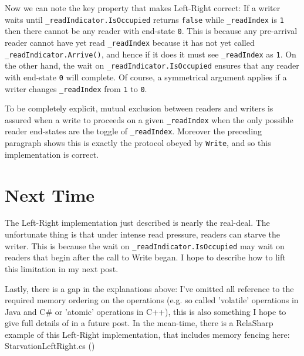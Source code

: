 \documentclass[11pt]{article}
\begin{document}
Now we can note the key property that makes Left-Right correct: If a writer waits until \texttt{\_readIndicator.IsOccupied} returns \texttt{false} while \texttt{\_readIndex} is \texttt{1} then there cannot be any reader with end-state \texttt{0}. This is because any pre-arrival reader cannot have yet read \texttt{\_readIndex} because it has not yet called \texttt{\_readIndicator.Arrive()}, and hence if it does it must see \texttt{\_readIndex} as \texttt{1}. On the other hand, the wait on \texttt{\_readIndicator.IsOccupied} ensures that any reader with end-state \texttt{0} will complete. Of course, a symmetrical argument applies if a writer changes \texttt{\_readIndex} from \texttt{1} to \texttt{0}.

To be completely explicit, mutual exclusion between readers and writers is assured when a write to proceeds on a given \texttt{\_readIndex} when the only possible reader end-states are the toggle of \texttt{\_readIndex}. Moreover the preceding paragraph shows this is exactly the protocol obeyed by \texttt{Write}, and so this implementation is correct.

\section{Next Time}

The Left-Right implementation just described is nearly the real-deal. The unfortunate thing is that under intense read pressure, readers can starve the writer. This is because the wait on \texttt{\_readIndicator.IsOccupied} may wait on readers that begin after the call to Write began. I hope to describe how to lift this limitation in my next post.

Lastly, there is a gap in the explanations above: I've omitted all reference to the required memory ordering on the operations (e.g. so called 'volatile' operations in Java and C\# or 'atomic' operations in C++), this is also something I hope to give full details of in a future post. In the mean-time, there is a RelaSharp example of this Left-Right implementation, that includes memory fencing here: StarvationLeftRight.cs (\texttt{})
\end{document}
